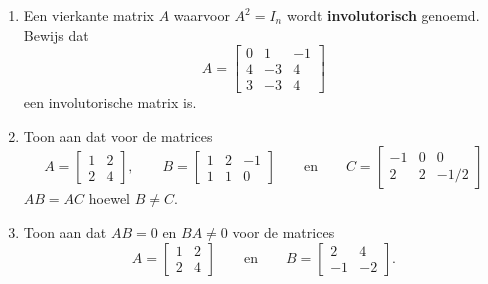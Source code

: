 \begin{enumerate}
% 

\item Een vierkante matrix $A$ waarvoor %
$A^2=I_n$ wordt {\bf involutorisch} genoemd. 
Bewijs dat 
\[ A=\begin{bmatrix}
0       &1      &-1 \\
4       &-3     &4 \\
3       &-3     &4
\end{bmatrix}\]
een involutorische matrix is.



\item Toon aan dat voor de matrices
\[ A=\begin{bmatrix}
1       &2 \\
2       &4
\end{bmatrix}, \qquad B=\begin{bmatrix}
1       &2      &-1 \\
1       &1      &0
\end{bmatrix}  \qquad\mbox{en}\qquad C=\begin{bmatrix}
-1      &0      &0 \\
2       &2      &-1/2
\end{bmatrix}\]
$AB=AC$ hoewel $B\neq C$.


\item Toon aan dat $AB=0$ en $BA\neq 0$ voor de matrices
\[ A=\begin{bmatrix}
1       &2 \\
2       &4
\end{bmatrix}\qquad \mbox{en}\qquad B=\begin{bmatrix}
2       &4 \\
-1      &-2
\end{bmatrix}.\]






\end{enumerate}
